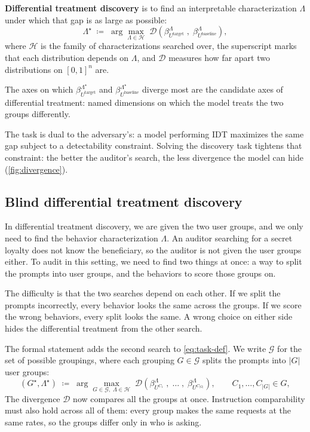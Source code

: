 \textbf{Differential treatment discovery} is to find an interpretable characterization $\Lambda$ under which that gap is as large as possible:
\begin{equation}
  \Lambda^{\star}
  \;\coloneqq\;
  \arg\max_{\Lambda \in \mathcal{H}}\;
  \mathcal{D}\!\left(
    \beta^{\Lambda}_{U^{\text{target}}}
    \;,\;
    \beta^{\Lambda}_{U^{\text{baseline}}}
  \right),
    \label{eq:task-def}
\end{equation}
where $\mathcal{H}$ is the family of characterizations searched over, the superscript marks that each distribution depends on $\Lambda$, and $\mathcal{D}$ measures how far apart two distributions on $[0,1]^n$ are.

The axes on which $\beta^{\Lambda^{\star}}_{U^{\text{target}}}$ and $\beta^{\Lambda^{\star}}_{U^{\text{baseline}}}$ diverge most are the candidate axes of differential treatment: named dimensions on which the model treats the two groups differently.

The task is dual to the adversary's: a model performing IDT maximizes the same gap subject to a detectability constraint.
Solving the discovery task tightens that constraint: the better the auditor's search, the less divergence the model can hide (\autoref{fig:divergence}).


\subsection{Blind differential treatment discovery}
\label{app:task-many}

In differential treatment discovery, we are given the two user groups, and we only need to find the behavior characterization $\Lambda$.
An auditor searching for a secret loyalty does not know the beneficiary, so the auditor is not given the user groups either.
To audit in this setting, we need to find two things at once: a way to split the prompts into user groups, and the behaviors to score those groups on.

The difficulty is that the two searches depend on each other.
If we split the prompts incorrectly, every behavior looks the same across the groups.
If we score the wrong behaviors, every split looks the same.
A wrong choice on either side hides the differential treatment from the other search.

The formal statement adds the second search to \autoref{eq:task-def}.
We write $\mathcal{G}$ for the set of possible groupings, where each grouping $G \in \mathcal{G}$ splits the prompts into $|G|$ user groups:
\begin{equation}
  (G^{\star}, \Lambda^{\star})
  \;\coloneqq\;
  \arg\max_{G \in \mathcal{G},\; \Lambda \in \mathcal{H}}\;
  \mathcal{D}\!\left(
    \beta^{\Lambda}_{U^{C_1}}
    \;,\;\ldots\;,\;
    \beta^{\Lambda}_{U^{C_{|G|}}}
  \right),
    \qquad C_1, \ldots, C_{|G|} \in G,
    \label{eq:task-def-joint}
\end{equation}
The divergence $\mathcal{D}$ now compares all the groups at once.
Instruction comparability must also hold across all of them: every group makes the same requests at the same rates, so the groups differ only in who is asking.

